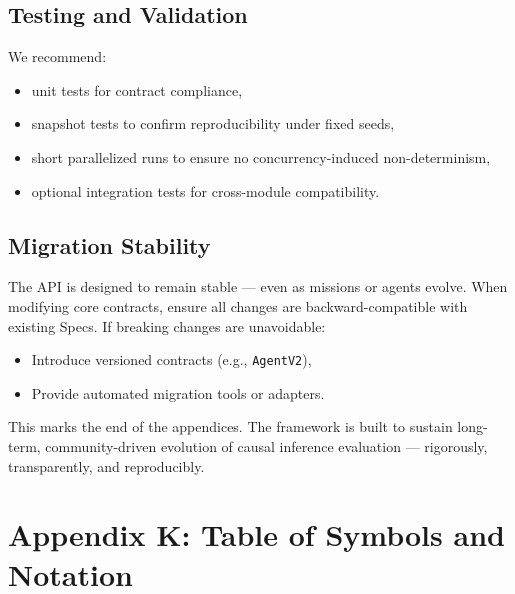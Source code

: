 \subsection{Testing and Validation}
We recommend:
\begin{itemize}
    \item unit tests for contract compliance,
    \item snapshot tests to confirm reproducibility under fixed seeds,
    \item short parallelized runs to ensure no concurrency-induced non-determinism,
    \item optional integration tests for cross-module compatibility.
\end{itemize}

\subsection{Migration Stability}
The API is designed to remain stable — even as missions or agents evolve.  
When modifying core contracts, ensure all changes are backward-compatible with existing Specs.
If breaking changes are unavoidable:
\begin{itemize}
    \item Introduce versioned contracts (e.g., \texttt{AgentV2}),
    \item Provide automated migration tools or adapters.
\end{itemize}

\bigskip
This marks the end of the appendices.  
The \game framework is built to sustain long-term, community-driven evolution of causal inference evaluation — rigorously, transparently, and reproducibly.


\section{Appendix K: Table of Symbols and Notation}
\label{appendix:table_of_symbols}

